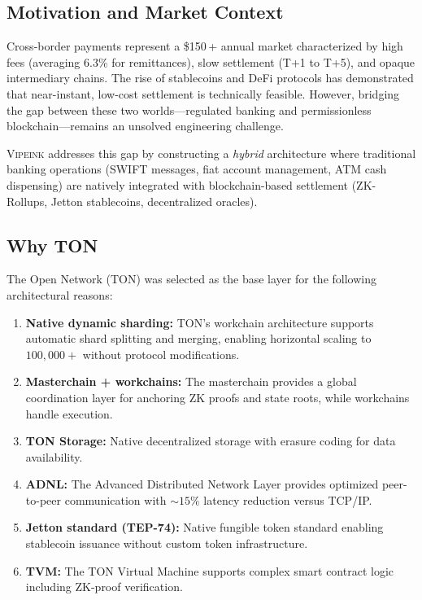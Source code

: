 \documentclass[12pt,a4paper]{article}
\theoremstyle{definition}
\theoremstyle{remark}
\newcommand{\Vipeink}{\textsc{Vipeink}}
\newcommand{\TON}{\textsc{TON}}
\newcommand{\BUSD}[1]{\$#1\,\text{B}}
\newcommand{\TPS}{\text{TPS}}
\begin{document}
\subsection{Motivation and Market Context}

Cross-border payments represent a \BUSD{150}+ annual market characterized by high fees (averaging 6.3\% for remittances), slow settlement (T+1 to T+5), and opaque intermediary chains. The rise of stablecoins and DeFi protocols has demonstrated that near-instant, low-cost settlement is technically feasible. However, bridging the gap between these two worlds---regulated banking and permissionless blockchain---remains an unsolved engineering challenge.

\Vipeink{} addresses this gap by constructing a \emph{hybrid} architecture where traditional banking operations (SWIFT messages, fiat account management, ATM cash dispensing) are natively integrated with blockchain-based settlement (ZK-Rollups, Jetton stablecoins, decentralized oracles).

\subsection{Why TON}

The Open Network (\TON{}) was selected as the base layer for the following architectural reasons:

\begin{enumerate}[nosep]
    \item \textbf{Native dynamic sharding:} TON's workchain architecture supports automatic shard splitting and merging, enabling horizontal scaling to $100{,}000+$ \TPS{} without protocol modifications.
    \item \textbf{Masterchain + workchains:} The masterchain provides a global coordination layer for anchoring ZK proofs and state roots, while workchains handle execution.
    \item \textbf{TON Storage:} Native decentralized storage with erasure coding for data availability.
    \item \textbf{ADNL:} The Advanced Distributed Network Layer provides optimized peer-to-peer communication with ${\sim}15\%$ latency reduction versus TCP/IP.
    \item \textbf{Jetton standard (TEP-74):} Native fungible token standard enabling stablecoin issuance without custom token infrastructure.
    \item \textbf{TVM:} The TON Virtual Machine supports complex smart contract logic including ZK-proof verification.
\end{enumerate}
\end{document}
